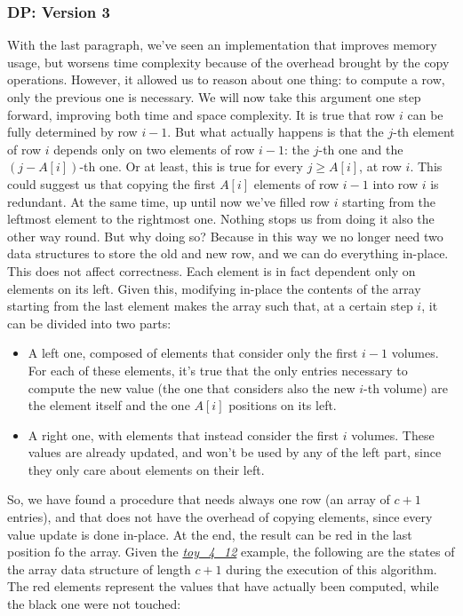 \documentclass[12pt]{extarticle}
\begin{document}
\subsubsection{DP: Version 3}
With the last paragraph, we've seen an implementation that improves memory usage, but worsens time complexity because of the overhead brought by the copy operations. However, it allowed us to reason about one thing: to compute a row, only the previous one is necessary. We will now take this argument one step forward, improving both time and space complexity.\newline
It is true that row $i$ can be fully determined by row $i-1$. But what actually happens is that the $j$-th element of row $i$ depends only on two elements of row $i-1$: the $j$-th one and the $(j-A[i])$-th one. Or at least, this is true for every $j \geq A[i]$, at row $i$. This could suggest us that copying the first $A[i]$ elements of row $i-1$ into row $i$ is redundant.\newline
At the same time, up until now we've filled row $i$ starting from the leftmost element to the rightmost one. Nothing stops us from doing it also the other way round. But why doing so? Because in this way we no longer need two data structures to store the old and new row, and we can do everything in-place. This does not affect correctness. Each element is in fact dependent only on elements on its left. Given this, modifying in-place the contents of the array starting from the last element makes the array such that, at a certain step $i$, it can be divided into two parts:
\begin{itemize}
    \item A left one, composed of elements that consider only the first $i-1$ volumes. For each of these elements, it's true that the only entries necessary to compute the new value (the one that considers also the new $i$-th volume) are the element itself and the one $A[i]$ positions on its left.
    \item A right one, with elements that instead consider the first $i$ volumes. These values are already updated, and won't be used by any of the left part, since they only care about elements on their left.
\end{itemize}
So, we have found a procedure that needs always one row (an array of $c+1$ entries), and that does not have the overhead of copying elements, since every value update is done in-place. At the end, the result can be red in the last position fo the array. Given the \hyperref[marker-toy-4-12]{\emph{toy\_4\_12}} example, the following are the states of the array data structure of length $c+1$ during the execution of this algorithm. The red elements represent the values that have actually been computed, while the black one were not touched:
\end{document}
